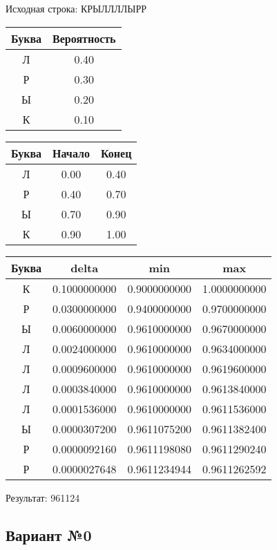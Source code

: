 \documentclass[a4paper, 12pt]{article}
\begin{document}
Исходная строка: КРЫЛЛЛЛЫРР\
\begin{center}
 \begin{tabular}{ |c|c| } 
  \hline
     Буква & Вероятность \\ \hline
Л & 0.40\\\hline
Р & 0.30\\\hline
Ы & 0.20\\\hline
К & 0.10
\\ \hline \end{tabular}
\end{center}
\begin{center}
 \begin{tabular}{ |c|c|c| } 
  \hline
     Буква & Начало & Конец \\ \hline
Л & 0.00 & 0.40\\\hline
Р & 0.40 & 0.70\\\hline
Ы & 0.70 & 0.90\\\hline
К & 0.90 & 1.00
\\ \hline \end{tabular}
\end{center}
\begin{center}
 \begin{tabular}{ |c|c|c|c| } 
  \hline
     Буква & delta & min & max \\ \hline
К & 0.1000000000 & 0.9000000000 & 1.0000000000\\\hline
Р & 0.0300000000 & 0.9400000000 & 0.9700000000\\\hline
Ы & 0.0060000000 & 0.9610000000 & 0.9670000000\\\hline
Л & 0.0024000000 & 0.9610000000 & 0.9634000000\\\hline
Л & 0.0009600000 & 0.9610000000 & 0.9619600000\\\hline
Л & 0.0003840000 & 0.9610000000 & 0.9613840000\\\hline
Л & 0.0001536000 & 0.9610000000 & 0.9611536000\\\hline
Ы & 0.0000307200 & 0.9611075200 & 0.9611382400\\\hline
Р & 0.0000092160 & 0.9611198080 & 0.9611290240\\\hline
Р & 0.0000027648 & 0.9611234944 & 0.9611262592
\\ \hline \end{tabular}
\end{center}
Результат: 961124
\pagebreak
\subsection{Вариант №0}
\end{document}
